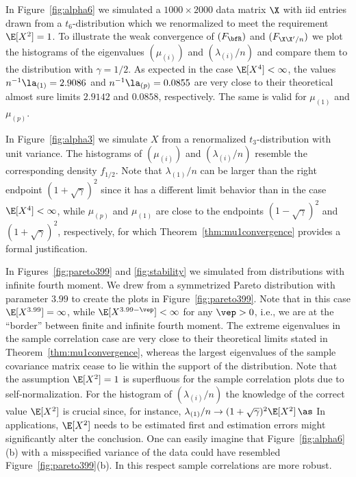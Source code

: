 In Figure~\ref{fig:alpha6} we simulated a $1000\times 2000$ data matrix $\X$ with iid entries drawn from a $t_6$-distribution which we renormalized to meet the requirement $\E[X^2]=1$. To illustrate the weak convergence of $(F_{\bfR})$ and $(F_{\X\X'/n})$ we plot the histograms of the eigenvalues $(\mu_{(i)})$ and $(\lambda_{(i)}/n)$ and compare them to the \MP distribution with $\gamma=1/2$. %
As expected in the case $\E[X^4]<\infty$, the values $n^{-1} \la_{(1)}=2.9086$ and $n^{-1} \la_{(p)}=0.0855$ are very close to their theoretical almost sure limits $2.9142$ and $0.0858$, respectively. The same is valid for $\mu_{(1)}$ and $\mu_{(p)}$.
\par

In Figure~\ref{fig:alpha3} we simulate $X$ from a renormalized $t_3$-distribution with unit variance. The histograms of $(\mu_{(i)})$ and $(\lambda_{(i)}/n)$ resemble the corresponding \MP density $f_{1/2}$. Note that $\lambda_{(1)}/n$ can be larger than the right endpoint $(1+\sqrt{\gamma})^2$ since it has a different limit behavior than in the case $\E[X^4]<\infty$, while $\mu_{(p)}$ and $\mu_{(1)}$ are close to the endpoints $(1-\sqrt{\gamma})^2$ and $(1+\sqrt{\gamma})^2$, respectively, for which Theorem~\ref{thm:mu1convergence} provides a formal justification.  
\par

In Figures~\ref{fig:pareto399} and \ref{fig:stability} we simulated from distributions with infinite fourth moment. 
We drew from a symmetrized Pareto distribution with parameter $3.99$ to create the plots in Figure~\ref{fig:pareto399}. 
Note that in this case $\E[X^{3.99}]=\infty$, while $\E[X^{3.99-\vep}]<\infty$ for any $\vep >0$, i.e., 
we are at the ``border'' between finite and infinite fourth moment. 
The extreme eigenvalues in the sample correlation case are very close to their theoretical limits stated in Theorem~\ref{thm:mu1convergence}, whereas 
the largest eigenvalues of the sample covariance matrix cease to lie within the support of the \MP distribution. 
Note that the assumption $\E[X^2]=1$ is superfluous for the sample correlation plots due to self-normalization. For the histogram of $(\lambda_{(i)}/n)$ the knowledge of the correct value $\E[X^2]$ is crucial since, for instance, $\lambda_{(1)}/n \to (1+\sqrt{\gamma})^2 \E[X^2]\, \as$ 
In applications, $\E[X^2]$ needs to be estimated first and estimation errors might significantly alter the conclusion. One can easily imagine that Figure~\ref{fig:alpha6}(b) with a misspecified variance of the data could have resembled Figure~\ref{fig:pareto399}(b). In this respect sample correlations are more robust. 
\par

